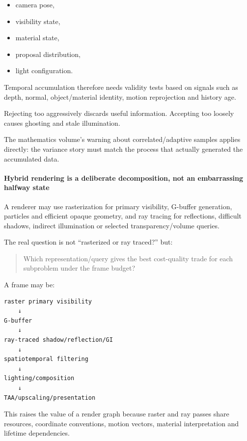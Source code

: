 \begin{itemize}
\tightlist
\item
  camera pose,
\item
  visibility state,
\item
  material state,
\item
  proposal distribution,
\item
  light configuration.
\end{itemize}

Temporal accumulation therefore needs validity tests based on signals such as depth, normal, object/material identity, motion reprojection and history age.

Rejecting too aggressively discards useful information. Accepting too loosely causes ghosting and stale illumination.

The mathematics volume's warning about correlated/adaptive samples applies directly: the variance story must match the process that actually generated the accumulated data.

\paragraph{Hybrid rendering is a deliberate decomposition, not an embarrassing halfway state}\label{hybrid-rendering-is-a-deliberate-decomposition-not-an-embarrassing-halfway-state}

A renderer may use rasterization for primary visibility, G-buffer generation, particles and efficient opaque geometry, and ray tracing for reflections, difficult shadows, indirect illumination or selected transparency/volume queries.

The real question is not ``rasterized or ray traced?'' but:

\begin{quote}
Which representation/query gives the best cost-quality trade for each subproblem under the frame budget?
\end{quote}

A frame may be:

\begin{verbatim}
raster primary visibility
    ↓
G-buffer
    ↓
ray-traced shadow/reflection/GI
    ↓
spatiotemporal filtering
    ↓
lighting/composition
    ↓
TAA/upscaling/presentation
\end{verbatim}

This raises the value of a render graph because raster and ray passes share resources, coordinate conventions, motion vectors, material interpretation and lifetime dependencies.

